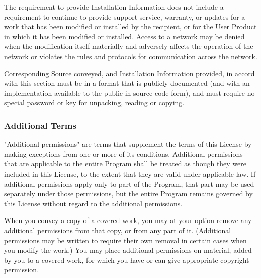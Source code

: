 \documentclass{ctexart}
\begin{document}
  The requirement to provide Installation Information does not include a
requirement to continue to provide support service, warranty, or updates
for a work that has been modified or installed by the recipient, or for
the User Product in which it has been modified or installed.  Access to a
network may be denied when the modification itself materially and
adversely affects the operation of the network or violates the rules and
protocols for communication across the network.

  Corresponding Source conveyed, and Installation Information provided,
in accord with this section must be in a format that is publicly
documented (and with an implementation available to the public in
source code form), and must require no special password or key for
unpacking, reading or copying.

\subsubsection{Additional Terms}

  "Additional permissions" are terms that supplement the terms of this
License by making exceptions from one or more of its conditions.
Additional permissions that are applicable to the entire Program shall
be treated as though they were included in this License, to the extent
that they are valid under applicable law.  If additional permissions
apply only to part of the Program, that part may be used separately
under those permissions, but the entire Program remains governed by
this License without regard to the additional permissions.

  When you convey a copy of a covered work, you may at your option
remove any additional permissions from that copy, or from any part of
it.  (Additional permissions may be written to require their own
removal in certain cases when you modify the work.)  You may place
additional permissions on material, added by you to a covered work,
for which you have or can give appropriate copyright permission.
\end{document}
